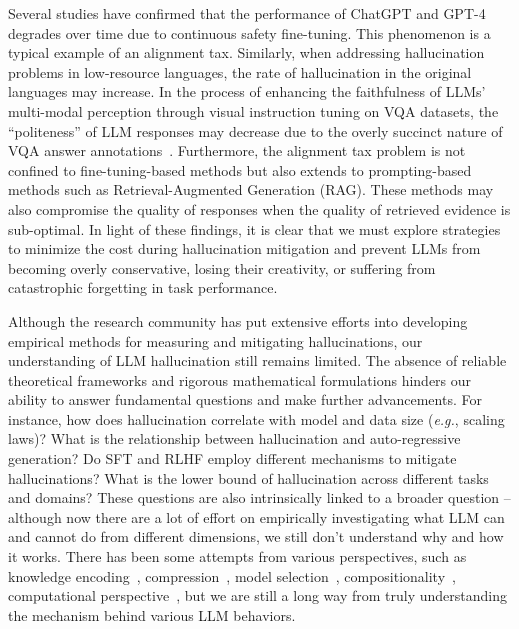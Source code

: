 Several studies have confirmed that the performance of ChatGPT and GPT-4 degrades over time due to continuous safety fine-tuning. This phenomenon is a typical example of an alignment tax. Similarly, when addressing hallucination problems in low-resource languages, the rate of hallucination in the original languages may increase. In the process of enhancing the faithfulness of LLMs' multi-modal perception through visual instruction tuning on VQA datasets, the ``politeness'' of LLM responses may decrease due to the overly succinct nature of VQA answer annotations~. Furthermore, the alignment tax problem is not confined to fine-tuning-based methods but also extends to prompting-based methods such as Retrieval-Augmented Generation (RAG). These methods may also compromise the quality of responses when the quality of retrieved evidence is sub-optimal. In light of these findings, it is clear that we must explore strategies to minimize the cost during hallucination mitigation and prevent LLMs from becoming overly conservative, losing their creativity, or suffering from catastrophic forgetting in task performance.

Although the research community has put extensive efforts into developing empirical methods for measuring and mitigating hallucinations, our understanding of LLM hallucination still remains limited. The absence of reliable theoretical frameworks and rigorous mathematical formulations hinders our ability to answer fundamental questions and make further advancements. For instance, how does hallucination correlate with model and data size (\textit{e.g.}, scaling laws)? What is the relationship between hallucination and auto-regressive generation? Do SFT and RLHF employ different mechanisms to mitigate hallucinations? What is the lower bound of hallucination across different tasks and domains? These questions are also intrinsically linked to a broader question -- although now there are a lot of effort on empirically investigating what LLM can and cannot do from different dimensions, we still don't understand why and how it works. There has been some attempts from various perspectives, such as knowledge encoding~, compression~, model selection~, compositionality~, computational perspective~, but we are still a long way from truly understanding the mechanism behind various LLM behaviors.

